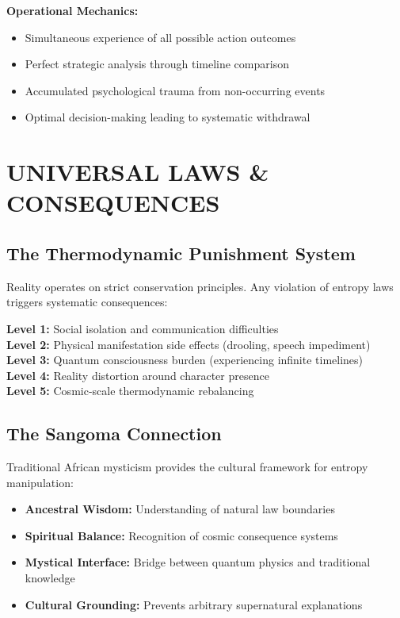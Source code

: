\documentclass[12pt,a4paper]{article}
\begin{document}
\textbf{Operational Mechanics:}
\begin{itemize}
\item Simultaneous experience of all possible action outcomes
\item Perfect strategic analysis through timeline comparison
\item Accumulated psychological trauma from non-occurring events
\item Optimal decision-making leading to systematic withdrawal
\end{itemize}

\section{UNIVERSAL LAWS \& CONSEQUENCES}

\subsection{The Thermodynamic Punishment System}
Reality operates on strict conservation principles. Any violation of entropy laws triggers systematic consequences:

\begin{tcolorbox}[colback=lightgray,colframe=darkblue,title=\textbf{Consequence Hierarchy}]
\textbf{Level 1:} Social isolation and communication difficulties\\
\textbf{Level 2:} Physical manifestation side effects (drooling, speech impediment)\\
\textbf{Level 3:} Quantum consciousness burden (experiencing infinite timelines)\\
\textbf{Level 4:} Reality distortion around character presence\\
\textbf{Level 5:} Cosmic-scale thermodynamic rebalancing
\end{tcolorbox}

\subsection{The Sangoma Connection}
Traditional African mysticism provides the cultural framework for entropy manipulation:
\begin{itemize}
\item \textbf{Ancestral Wisdom:} Understanding of natural law boundaries
\item \textbf{Spiritual Balance:} Recognition of cosmic consequence systems
\item \textbf{Mystical Interface:} Bridge between quantum physics and traditional knowledge
\item \textbf{Cultural Grounding:} Prevents arbitrary supernatural explanations
\end{itemize}
\end{document}
